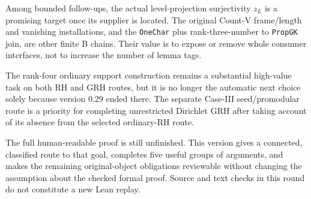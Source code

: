 Among bounded follow-ups, the actual level-projection surjectivity
$z_L$ is a promising target once its supplier is located.  The original
Count-V frame/length and vanishing installations, and the
\texttt{OneChar} plus rank-three-number to \texttt{PropGK} join, are
other finite B chains.  Their value is to expose or remove whole
consumer interfaces, not to increase the number of lemma tags.

The rank-four ordinary support construction remains a substantial
high-value task on both RH and GRH routes, but it is no longer the
automatic next choice solely because version 0.29 ended there.
The separate Case-III seed/promodular route is a priority for completing
unrestricted Dirichlet GRH after taking account of its absence from
the selected ordinary-RH route.

The full human-readable proof is still unfinished.  This version gives a
connected, classified route to that goal, completes five useful groups
of arguments, and makes the remaining original-object obligations
reviewable without changing the assumption about the checked formal
proof.  Source and text checks in this round do not constitute a new
Lean replay.
